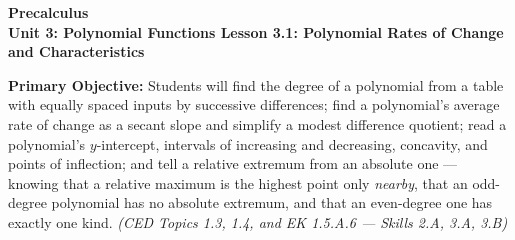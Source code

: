 \documentclass[10pt]{article}
\newcommand{\CourseName}{Precalculus}
\newcommand{\UnitNumberName}{Unit 3: Polynomial Functions \quad}
\newcommand{\LessonNumberName}{Lesson 3.1: Polynomial Rates of Change and Characteristics}
\begin{document}
\begin{center}
    {\Large\bfseries \CourseName \\
    {\small\bfseries \UnitNumberName \LessonNumberName}}
\end{center}

\begin{tcolorbox}[colback=lilac, colframe=plum, boxrule=0.9pt, arc=2mm,
    left=2mm, right=2mm, top=1.5mm, bottom=1.5mm]
    \textbf{Primary Objective:} Students will find the degree of a polynomial from a table with
    equally spaced inputs by successive differences; find a polynomial's average rate of change
    as a secant slope and simplify a modest difference quotient; read a polynomial's
    $y$-intercept, intervals of increasing and decreasing, concavity, and points of inflection;
    and tell a relative extremum from an absolute one --- knowing that a relative maximum is the
    highest point only \emph{nearby}, that an odd-degree polynomial has no absolute extremum, and
    that an even-degree one has exactly one kind.
    \hfill\textit{\small (CED Topics 1.3, 1.4, and EK 1.5.A.6 --- Skills 2.A, 3.A, 3.B)}
\end{tcolorbox}
\end{document}
